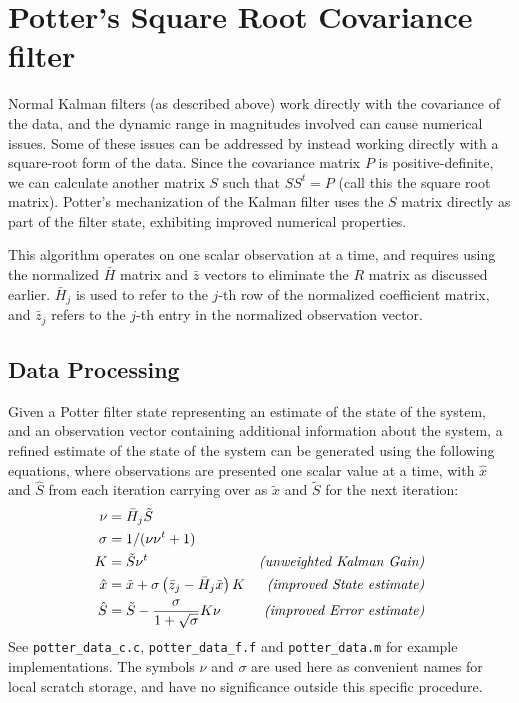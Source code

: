 \section{Potter's Square Root Covariance filter}

Normal Kalman filters (as described above) work directly with the
covariance of the data, and the dynamic range in magnitudes involved
can cause numerical issues. Some of these issues can be addressed by
instead working directly with a square-root form of the data. Since
the covariance matrix $P$ is positive-definite, we can calculate another
matrix $S$ such that $S S^t = P$ (call this the square root matrix).
Potter's mechanization of the Kalman filter uses the $S$ matrix directly
as part of the filter state, exhibiting improved numerical properties.

This algorithm operates on one scalar observation at a time, and
requires using the normalized ${\bar H}$ matrix and ${\bar z}$ vectors
to eliminate the $R$ matrix as discussed earlier. ${\bar H}_j$ is used
to refer to the $j$-th row of the normalized coefficient matrix, and
${\bar z}_j$ refers to the $j$-th entry in the normalized observation vector.

\subsection{Data Processing}
Given a Potter filter state
representing an estimate of the state of the system,
and an observation vector containing additional information
about the system,
a refined estimate of the state of the system
can be generated using the following equations,
where observations are presented one scalar value at a time,
with
${\hat x}$ and ${\hat S}$
from each iteration
carrying over as
${\tilde x}$ and ${\tilde S}$
for the next iteration:
\begin{subequations}
\label{potterdata}
\begin{align}
\nu & = {\bar H}_j {\tilde S}
\\
\sigma & = 1 / ( \nu \nu^t + 1 )
\\
K & = {\tilde S} \nu^t
  & \mbox{\it (unweighted Kalman Gain)}
\\
{\hat x} & = {\tilde x} +
    \sigma \left( {\bar z}_j - {\bar H}_j {\tilde x} \right) K
  & \mbox{\it (improved State estimate)}
\label{potterdatax}
\\
{\hat S} & = {\tilde S} - \frac{\sigma}{1 + \sqrt{\sigma}} K \nu
  & \mbox{\it (improved Error estimate)}
\label{potterdatas}
\end{align}
\end{subequations}
See \verb|potter_data_c.c|, \verb|potter_data_f.f| and \verb|potter_data.m|
for example implementations.
The symbols $\nu$ and $\sigma$
are used here as convenient names
for local scratch storage,
and have no significance
outside this specific procedure.
